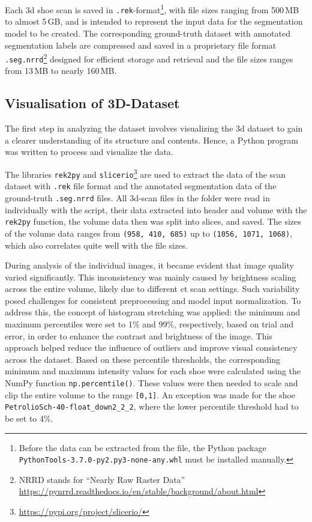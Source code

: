 \medskip

Each \gls{3d} shoe scan is saved in {\tt.rek}-format\footnote{Before the data can be extracted from the file, the Python package {\tt PythonTools-3.7.0-py2.py3-none-any.whl} must be installed manually.}, with file sizes ranging from 500\,MB to almost 5\,GB, and is intended to represent the input data for the segmentation model to be created. The corresponding ground-truth dataset with annotated segmentation labels are compressed and saved in a proprietary file format {\tt .seg.nrrd}\footnote{NRRD stands for \enquote{Nearly Raw Raster Data} \url{https://pynrrd.readthedocs.io/en/stable/background/about.html}} designed for efficient storage and retrieval and the file sizes ranges from 13\,MB to nearly 160\,MB.


\subsection{Visualisation of 3D-Dataset} \label{sec::visualizing_the_volumes}
The first step in analyzing the dataset involves visualizing the \gls{3d} dataset to gain a clearer understanding of its structure and contents. Hence, a Python program was written to process and visualize the data. 

\medskip

The libraries {\tt rek2py} and {\tt slicerio}\footnote{\url{https://pypi.org/project/slicerio/}} are used to extract the data of the scan dataset with {\tt .rek} file format and the annotated segmentation data of the ground-truth {\tt .seg.nrrd} files. All \gls{3d}-scan files in the folder were read in individually with the script, their data extracted into header and volume with the {\tt rek2py} function, the volume data then was split into slices, and saved. The sizes of the volume data ranges from {\tt (958, 410, 685)} up to {\tt (1056, 1071, 1068)}, which also correlates quite well with the file sizes. 

\medskip

During analysis of the individual images, it became evident that image quality varied significantly. This inconsistency was mainly caused by brightness scaling across the entire volume, likely due to different \gls{ct} scan settings. Such variability posed challenges for consistent preprocessing and model input normalization. To address this, the concept of histogram stretching was applied: the minimum and maximum percentiles were set to 1\% and 99\%, respectively, based on trial and error, in order to enhance the contrast and brightness of the image. This approach helped reduce the influence of outliers and improve visual consistency across the dataset. Based on these percentile thresholds, the corresponding minimum and maximum intensity values for each shoe were calculated using the NumPy function {\tt np.percentile()}. These values were then needed to scale and clip the entire volume to the range {\tt [0,1]}. An exception was made for the shoe {\tt PetrolioSch-40-float\_down2\_2\_2}, where the lower percentile threshold had to be set to 4\%.

